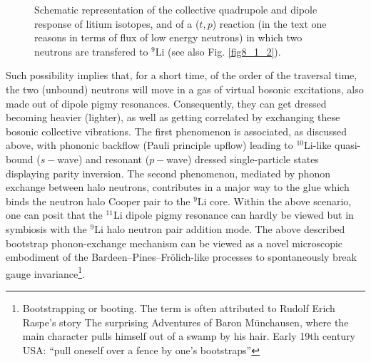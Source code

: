 \begin{subappendices}
\begin{figure}[h!]
\begin{center}
	\end{center}
	\caption{Schematic representation of the collective quadrupole and dipole response of litium isotopes, and of a ($t,p$) reaction (in the text one reasons in terms of flux of low energy neutrons) in which two neutrons are transfered to $^9$Li (see also Fig. \ref{fig8_1_2}).}
\label{fig8_A_1}
\end{figure}
Such possibility implies that, for a short time, of the order of the traversal time, the two (unbound) neutrons will move in a gas of virtual bosonic excitations, also made out of dipole pigmy resonances. Consequently, they can get dressed becoming heavier (lighter), as well as getting correlated by exchanging  these bosonic collective vibrations. 
The first phenomenon is associated, as discussed above, with phononic backflow (Pauli principle upflow) leading to $^{10}$Li-like quasi-bound ($s-$wave) and resonant ($p-$wave) dressed single-particle states displaying parity inversion.
The second phenomenon, mediated by phonon exchange between halo neutrons, contributes in a major way to the glue which binds the neutron halo Cooper pair to the $^{9}$Li core. Within the above scenario, one can posit that the $^{11}$Li dipole pigmy resonance can hardly be viewed but in symbiosis with the $^9$Li halo neutron pair addition mode. The above described bootstrap phonon-exchange mechanism can be viewed as a novel microscopic embodiment of the Bardeen--Pines--Fr\"{o}lich-like processes to spontaneously break gauge invariance\footnote{Bootstrapping or booting. The term is often attributed to Rudolf Erich Raspe's story The surprising Adventures of Baron M\=unchausen, where the main character pulls himself out of a swamp by his hair. Early 19th century USA: ``pull oneself over a fence by one's bootstraps''}.



\end{subappendices}
